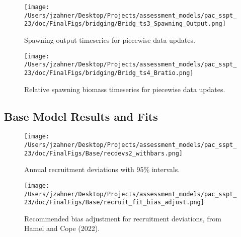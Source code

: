 \documentclass[11pt,
  letterpaper,
]{article}
\begin{document}
\begin{figure}
{\centering
\texttt{[image: /Users/jzahner/Desktop/Projects/assessment\_models/pac\_sspt\_23/doc/FinalFigs/bridging/Bridg\_ts3\_Spawning\_Output.png]}
}
\caption{Spawning output timeseries for piecewise data updates.\label{fig:bridge_spawnout_data}}
\end{figure}

\begin{figure}
{\centering
\texttt{[image: /Users/jzahner/Desktop/Projects/assessment\_models/pac\_sspt\_23/doc/FinalFigs/bridging/Bridg\_ts4\_Bratio.png]}
}
\caption{Relative spawning biomass timeseries for piecewise data updates.\label{fig:bridge_bratio_data}}
\end{figure}

\clearpage

\hypertarget{base-model-results-and-fits}{%
\subsection{Base Model Results and Fits}\label{base-model-results-and-fits}}

\begin{figure}
{\centering
\texttt{[image: /Users/jzahner/Desktop/Projects/assessment\_models/pac\_sspt\_23/doc/FinalFigs/Base/recdevs2\_withbars.png]}
}
\caption{Annual recruitment deviations with 95\% intervals.\label{fig:recdevs}}
\end{figure}

\begin{figure}
{\centering
\texttt{[image: /Users/jzahner/Desktop/Projects/assessment\_models/pac\_sspt\_23/doc/FinalFigs/Base/recruit\_fit\_bias\_adjust.png]}
}
\caption{Recommended bias adjustment for recruitment deviations, from Hamel and Cope (2022).\label{fig:recdevs_bias_adjust}}
\end{figure}
\end{document}
